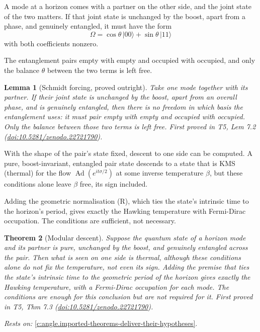 \documentclass[11pt]{article}
\newtheorem{theorem}{Theorem}[section]
\newtheorem{lemma}[theorem]{Lemma}
\theoremstyle{definition}
\theoremstyle{plain}
\begin{document}
A mode at a horizon comes with a partner on the other side, and the joint state of the two matters. If that joint state is unchanged by the boost, apart from a phase, and genuinely entangled, it must have the form \[ \Omega = \cos\theta\,|00\rangle + \sin\theta\,|11\rangle \] with both coefficients nonzero.

The entanglement pairs empty with empty and occupied with occupied, and only the balance $\theta$ between the two terms is left free.

\begin{lemma}[Schmidt forcing, proved outright]\label{c:singularity.schmidt-forcing-proved-outright}
Take one mode together with its partner. If their joint state is unchanged by the boost, apart from an overall phase, and is genuinely entangled, then there is no freedom in which basis the entanglement uses: it must pair empty with empty and occupied with occupied. Only the balance between those two terms is left free.
\emph{First proved in} T5, Lem 7.2 (\href{https://doi.org/10.5281/zenodo.22721790}{doi:10.5281/zenodo.22721790}).
\end{lemma}

With the shape of the pair's state fixed, descent to one side can be computed. A pure, boost-invariant, entangled pair state descends to a state that is KMS (thermal) for the flow $\operatorname{Ad}(e^{it\sigma/2})$ at some inverse temperature $\beta$, but these conditions alone leave $\beta$ free, its sign included.

Adding the geometric normalisation (R), which ties the state's intrinsic time to the horizon's period, gives exactly the Hawking temperature with Fermi-Dirac occupation. The conditions are sufficient, not necessary.

\begin{theorem}[Modular descent]\label{c:singularity.modular-descent}
Suppose the quantum state of a horizon mode and its partner is pure, unchanged by the boost, and genuinely entangled across the pair. Then what is seen on one side is thermal, although these conditions alone do not fix the temperature, not even its sign. Adding the premise that ties the state's intrinsic time to the geometric period of the horizon gives exactly the Hawking temperature, with a Fermi-Dirac occupation for each mode. The conditions are enough for this conclusion but are not required for it.
\emph{First proved in} T5, Thm 7.3 (\href{https://doi.org/10.5281/zenodo.22721790}{doi:10.5281/zenodo.22721790}).
\end{theorem}
\noindent\emph{Rests on:} \ref{c:angle.imported-theorems-deliver-their-hypotheses}.
\end{document}
